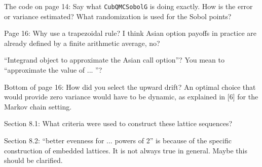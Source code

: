 \documentclass{amsart}
\begin{document}

\vspace{1cm}

The code on page 14: Say what \texttt{CubQMCSobolG} is doing exactly. How is the error or variance estimated? What randomization is used for the Sobol points?


\vspace{1cm}

Page 16: Why use a trapezoidal rule? I think Asian option payoffs in practice are already defined by a finite arithmetic average, no?


\vspace{1cm}

``Integrand object to approximate the Asian call option''? You mean to ``approximate the value of ... ''?

\vspace{1cm}

Bottom of page 16: How did you select the upward drift? An optimal choice that would provide zero variance would have to be dynamic, as explained in [6] for the Markov chain
setting.


\vspace{1cm}

Section 8.1: What criteria were used to construct these lattice sequences?

\vspace{1cm}

Section 8.2: “better evenness for ... powers of 2” is because of the specific construction of embedded lattices. It is not always true in general. Maybe this should be clarified.
\end{document}
